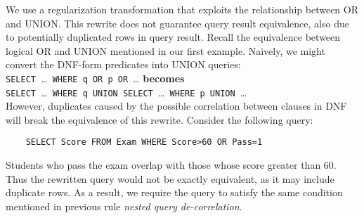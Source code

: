 
We use a regularization transformation that exploits the relationship between OR and UNION. 
This rewrite does not guarantee query result equivalence, also due to potentially duplicated rows in query result.
Recall the equivalence between logical OR and UNION mentioned in our first example. 
Naively, we might convert the DNF-form predicates into UNION queries:\\
\noindent\texttt{SELECT }\ldots\texttt{ WHERE q OR p OR }\ldots\texttt{} \textbf{becomes}\\
\hspace*{5mm}\texttt{SELECT }\ldots\texttt{ WHERE q UNION SELECT }\ldots\texttt{ WHERE p UNION }\ldots\\
However, duplicates caused by the possible correlation between clauses in DNF will break the equivalence of this rewrite. Consider the following query:
{\footnotesize
\begin{verbatim}
	SELECT Score FROM Exam WHERE Score>60 OR Pass=1
\end{verbatim}
}
Students who pass the exam overlap with those whose score greater than 60.
Thus the rewritten query would not be exactly equivalent, as it may include duplicate rows.
As a result, we require the query to satisfy the same condition mentioned in previous rule \textit{nested query de-correlation}.
%

